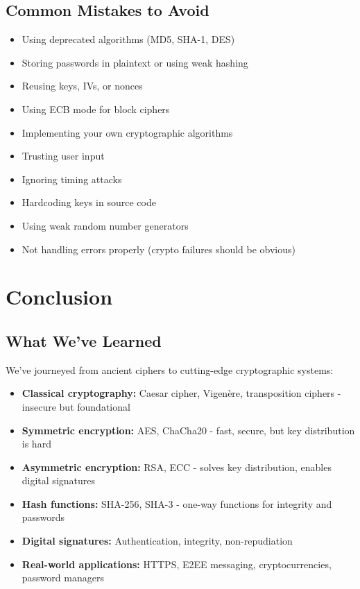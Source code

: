 \documentclass[11pt,a4paper]{report}
\begin{document}
\section{Common Mistakes to Avoid}

\begin{itemize}
\item Using deprecated algorithms (MD5, SHA-1, DES)
\item Storing passwords in plaintext or using weak hashing
\item Reusing keys, IVs, or nonces
\item Using ECB mode for block ciphers
\item Implementing your own cryptographic algorithms
\item Trusting user input
\item Ignoring timing attacks
\item Hardcoding keys in source code
\item Using weak random number generators
\item Not handling errors properly (crypto failures should be obvious)
\end{itemize}

\newpage
\chapter{Conclusion}

\section{What We've Learned}

We've journeyed from ancient ciphers to cutting-edge cryptographic systems:

\begin{itemize}
\item \textbf{Classical cryptography:} Caesar cipher, Vigenère, transposition ciphers - insecure but foundational

\item \textbf{Symmetric encryption:} AES, ChaCha20 - fast, secure, but key distribution is hard

\item \textbf{Asymmetric encryption:} RSA, ECC - solves key distribution, enables digital signatures

\item \textbf{Hash functions:} SHA-256, SHA-3 - one-way functions for integrity and passwords

\item \textbf{Digital signatures:} Authentication, integrity, non-repudiation

\item \textbf{Real-world applications:} HTTPS, E2EE messaging, cryptocurrencies, password managers
\end{itemize}
\end{document}
